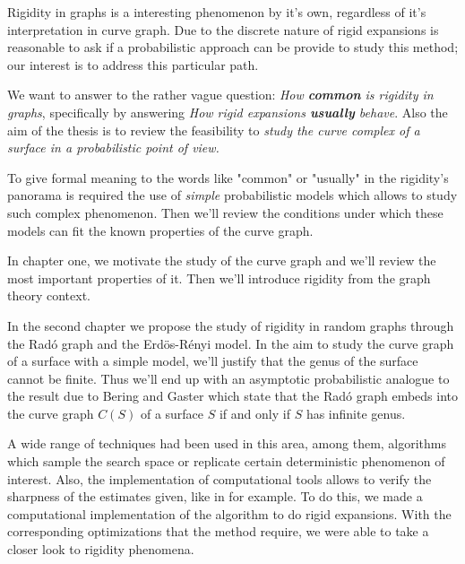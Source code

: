 Rigidity in graphs is a interesting phenomenon by it's own, regardless of it's interpretation in curve graph. Due to the discrete nature of rigid expansions is reasonable to ask if a probabilistic approach can be provide to study this method; our interest is to address this particular path.

We want to answer to the rather vague question: \textit{How \textbf{common} is rigidity in graphs}, specifically by answering \textit{How rigid expansions \textbf{usually} behave}. Also the aim of the thesis is to review the feasibility to \textit{study the curve complex of a surface in a probabilistic point of view.}

To give formal meaning to the words like "common" or "usually" in the rigidity's panorama is required the use of \textit{simple} probabilistic models which allows to study such complex phenomenon. Then we'll review the conditions under which these models can fit the known properties of the curve graph.

In chapter one, we motivate the study of the curve graph and we'll review the most important properties of it. Then we'll introduce rigidity from the graph theory context.

In the second chapter we propose the study of rigidity in random graphs through the Radó graph and the Erdös-Rényi model. In the aim to study the curve graph of a surface with a simple model, we'll justify that the genus of the surface cannot be finite. Thus we'll end up with an asymptotic probabilistic analogue to the result due to Bering and Gaster which state that the Radó graph embeds into the curve graph $C(S)$ of a surface $S$ if and only if $S$ has infinite genus.

A wide range of techniques had been used in this area, among them, algorithms which sample the search space or replicate certain deterministic phenomenon of interest. Also, the implementation of computational tools allows to verify the sharpness of the estimates given, like in \cite{Meshulam13} for example. To do this, we made a computational implementation of the algorithm to do rigid expansions. With the corresponding optimizations that the method require, we were able to take a closer look to rigidity phenomena.



























